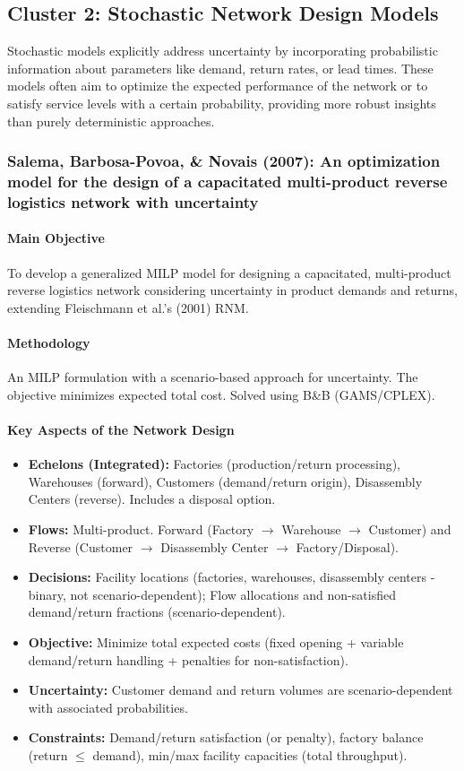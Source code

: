 \subsection{Cluster 2: Stochastic Network Design Models}
Stochastic models explicitly address uncertainty by incorporating probabilistic information about parameters like demand, return rates, or lead times. These models often aim to optimize the expected performance of the network or to satisfy service levels with a certain probability, providing more robust insights than purely deterministic approaches.

\subsubsection{Salema, Barbosa-Povoa, \& Novais (2007): An optimization model for the design of a capacitated multi-product reverse logistics network with uncertainty}
\paragraph{Main Objective} To develop a generalized MILP model for designing a capacitated, multi-product reverse logistics network considering uncertainty in product demands and returns, extending Fleischmann et al.'s (2001) RNM.
\paragraph{Methodology} An MILP formulation with a scenario-based approach for uncertainty. The objective minimizes expected total cost. Solved using B\&B (GAMS/CPLEX).
\paragraph{Key Aspects of the Network Design}
\begin{itemize}
    \item \textbf{Echelons (Integrated):} Factories (production/return processing), Warehouses (forward), Customers (demand/return origin), Disassembly Centers (reverse). Includes a disposal option.
    \item \textbf{Flows:} Multi-product. Forward (Factory $\rightarrow$ Warehouse $\rightarrow$ Customer) and Reverse (Customer $\rightarrow$ Disassembly Center $\rightarrow$ Factory/Disposal).
    \item \textbf{Decisions:} Facility locations (factories, warehouses, disassembly centers - binary, not scenario-dependent); Flow allocations and non-satisfied demand/return fractions (scenario-dependent).
    \item \textbf{Objective:} Minimize total expected costs (fixed opening + variable demand/return handling + penalties for non-satisfaction).
    \item \textbf{Uncertainty:} Customer demand and return volumes are scenario-dependent with associated probabilities.
    \item \textbf{Constraints:} Demand/return satisfaction (or penalty), factory balance (return $\le$ demand), min/max facility capacities (total throughput).
\end{itemize}

